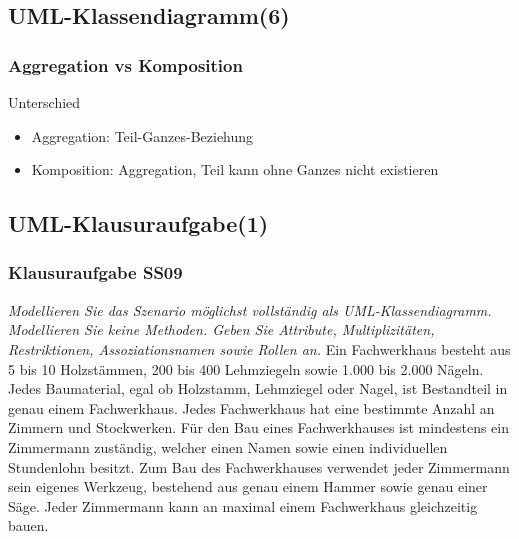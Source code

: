 \documentclass[18pt]{beamer}
\begin{document}
	\subsection{UML-Klassendiagramm(6)}
	\begin{frame}
		\frametitle{Aggregation vs Komposition}
		\begin{alertblock}{Unterschied}
			\begin{itemize}
				\item Aggregation: Teil-Ganzes-Beziehung
				\item Komposition: Aggregation, Teil kann ohne Ganzes nicht existieren
			\end{itemize}
		\end{alertblock}
	\end{frame}
	
	\subsection{UML-Klausuraufgabe(1)}
	\begin{frame}
		\frametitle{Klausuraufgabe SS09}
		\textit{Modellieren Sie das Szenario möglichst vollständig als UML-Klassendiagramm. Modellieren Sie keine Methoden. Geben Sie Attribute, Multiplizitäten, Restriktionen, Assoziationsnamen sowie Rollen an.} \linebreak
		Ein Fachwerkhaus besteht aus 5 bis 10 Holzstämmen, 200 bis 400 Lehmziegeln sowie 1.000 bis 2.000 Nägeln. Jedes Baumaterial, egal ob Holzstamm, Lehmziegel oder Nagel, ist Bestandteil in genau einem Fachwerkhaus. Jedes Fachwerkhaus hat eine bestimmte Anzahl an Zimmern und Stockwerken. Für den Bau eines Fachwerkhauses ist mindestens ein Zimmermann zuständig, welcher einen Namen sowie einen individuellen Stundenlohn besitzt. Zum Bau des Fachwerkhauses verwendet jeder Zimmermann sein eigenes Werkzeug, bestehend aus genau einem Hammer sowie genau einer Säge. Jeder Zimmermann kann an maximal einem Fachwerkhaus gleichzeitig bauen. 
	\end{frame}
	
\end{document}
